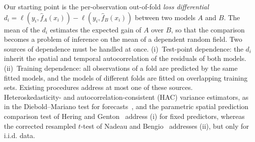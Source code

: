 Our starting point is the per-observation out-of-fold \emph{loss differential} $d_i = \ell(y_i,\hat f_A(x_i)) - \ell(y_i,\hat f_B(x_i))$ between two models $A$ and $B$. The mean of the $d_i$ estimates the expected gain of $A$ over $B$, so that the comparison becomes a problem of inference on the mean of a dependent random field. Two sources of dependence must be handled at once. (i)~Test-point dependence: the $d_i$ inherit the spatial and temporal autocorrelation of the residuals of both models. (ii)~Training dependence: all observations of a fold are predicted by the same fitted models, and the models of different folds are fitted on overlapping training sets. Existing procedures address at most one of these sources. Heteroskedasticity- and autocorrelation-consistent (HAC) variance estimators, as in the Diebold--Mariano test for forecasts~\cite{diebold1995}, and the parametric spatial prediction comparison test of Hering and Genton~\cite{hering2011} address (i) for fixed predictors, whereas the corrected resampled $t$-test of Nadeau and Bengio~\cite{nadeau2003} addresses (ii), but only for i.i.d. data.

